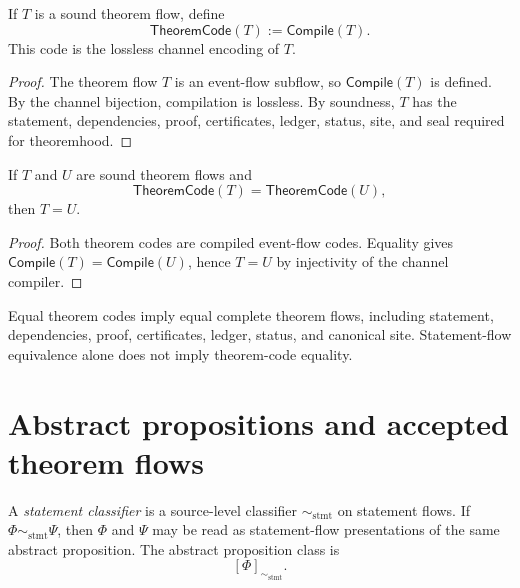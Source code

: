 \begin{theorem}
\label{thm:theorem-proof-sound-flow-theorem-code}
If $T$ is a sound theorem flow, define
$$
  \mathsf{TheoremCode}(T):=\mathsf{Compile}(T).
$$
This code is the lossless channel encoding of $T$.
\end{theorem}

\begin{proof}
The theorem flow $T$ is an event-flow subflow, so $\mathsf{Compile}(T)$ is defined. By the channel bijection, compilation is lossless. By soundness, $T$ has the statement, dependencies, proof, certificates, ledger, status, site, and seal required for theoremhood.
\end{proof}

\begin{theorem}
\label{thm:theorem-proof-code-injective}
If $T$ and $U$ are sound theorem flows and
$$
  \mathsf{TheoremCode}(T)=\mathsf{TheoremCode}(U),
$$
then $T=U$.
\end{theorem}

\begin{proof}
Both theorem codes are compiled event-flow codes. Equality gives $\mathsf{Compile}(T)=\mathsf{Compile}(U)$, hence $T=U$ by injectivity of the channel compiler.
\end{proof}

\begin{corollary}
\label{cor:theorem-proof-code-stronger-than-statement}
Equal theorem codes imply equal complete theorem flows, including statement, dependencies, proof, certificates, ledger, status, and canonical site. Statement-flow equivalence alone does not imply theorem-code equality.
\end{corollary}

\section{Abstract propositions and accepted theorem flows}
\label{sec:theorem-proof-abstract-accepted}

\begin{definition}
\label{def:theorem-proof-statement-classifier}
A \emph{statement classifier} is a source-level classifier $\sim_{\mathrm{stmt}}$ on statement flows. If $\Phi\sim_{\mathrm{stmt}}\Psi$, then $\Phi$ and $\Psi$ may be read as statement-flow presentations of the same abstract proposition. The abstract proposition class is
$$
  [\Phi]_{\sim_{\mathrm{stmt}}}.
$$
\end{definition}

